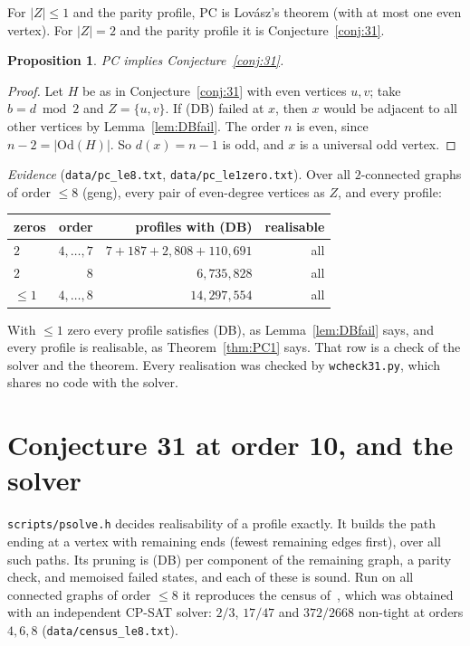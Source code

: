 \documentclass[11pt]{amsart}
\newtheorem{proposition}[theorem]{Proposition}
\theoremstyle{definition}
\newcommand{\lean}[1]{\quad{\footnotesize[Lean: \texttt{#1}]}}
\newcommand{\Od}{\mathrm{Od}}
\begin{document}
For $|Z|\le1$ and the parity profile, PC is Lov\'asz's theorem (with at most one even vertex). For $|Z|=2$
and the parity profile it is Conjecture~\ref{conj:31}.

\begin{proposition}\label{prop:PC31}
PC implies Conjecture~\ref{conj:31}.\lean{conj31\_of\_profileConj}
\end{proposition}
\begin{proof}
Let $H$ be as in Conjecture~\ref{conj:31} with even vertices $u,v$; take $b=d\bmod2$ and $Z=\{u,v\}$. If (DB)
failed at $x$, then $x$ would be adjacent to all other vertices by Lemma~\ref{lem:DBfail}. The order $n$ is
even, since $n-2=|\Od(H)|$. So $d(x)=n-1$ is odd, and $x$ is a universal odd vertex.
\end{proof}

\emph{Evidence} (\texttt{data/pc\_le8.txt}, \texttt{data/pc\_le1zero.txt}). Over all $2$-connected graphs of
order $\le8$ (geng), every pair of even-degree vertices as $Z$, and every profile:
\begin{center}\footnotesize
\begin{tabular}{@{}lrrr@{}}
\toprule
zeros & order & profiles with (DB) & realisable\\
\midrule
$2$ & $4,\dots,7$ & $7+187+2{,}808+110{,}691$ & all\\
$2$ & $8$ & $6{,}735{,}828$ & all\\
$\le1$ & $4,\dots,8$ & $14{,}297{,}554$ & all\\
\bottomrule
\end{tabular}
\end{center}
With $\le1$ zero every profile satisfies (DB), as Lemma~\ref{lem:DBfail} says, and every profile is
realisable, as Theorem~\ref{thm:PC1} says. That row is a check of the solver and the theorem. Every
realisation was checked by \texttt{wcheck31.py}, which shares no code with the solver.

\section{Conjecture 31 at order 10, and the solver}\label{sec:data}

\texttt{scripts/psolve.h} decides realisability of a profile exactly. It builds the path ending at a vertex
with remaining ends (fewest remaining edges first), over all such paths. Its pruning is (DB) per component
of the remaining graph, a parity check, and memoised failed states, and each of these is sound. Run on all
connected graphs of order $\le8$ it reproduces the census of~\cite[\S6.8]{EP}, which was obtained with an
independent CP-SAT solver: $2/3$, $17/47$ and $372/2668$ non-tight at orders $4,6,8$
(\texttt{data/census\_le8.txt}).
\end{document}
